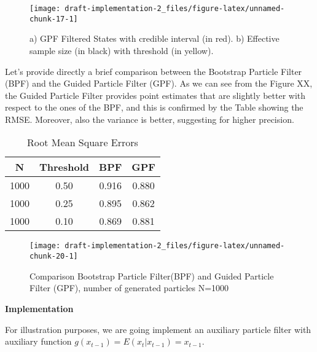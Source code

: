 \documentclass[
]{article}
\begin{document}
\begin{figure}[ht]

{\centering \texttt{[image: draft-implementation-2\_files/figure-latex/unnamed-chunk-17-1]} 

}

\caption{a) GPF Filtered States with credible interval (in red). b) Effective sample size (in black) with threshold (in yellow).}\label{fig:unnamed-chunk-17}
\end{figure}

Let's provide directly a brief comparison between the Bootstrap Particle
Filter (BPF) and the Guided Particle Filter (GPF). As we can see from
the Figure XX, the Guided Particle Filter provides point estimates that
are slightly better with respect to the ones of the BPF, and this is
confirmed by the Table showing the RMSE. Moreover, also the variance is
better, suggesting for higher precision.

\begin{longtable}[t]{cccc}
\caption{\label{tab:unnamed-chunk-19}Root Mean Square Errors}\\
\toprule
N & Threshold & BPF & GPF\\
\midrule
1000 & 0.50 & 0.916 & 0.880\\
1000 & 0.25 & 0.895 & 0.862\\
1000 & 0.10 & 0.869 & 0.881\\
\bottomrule
\end{longtable}

\begin{figure}[ht]

{\centering \texttt{[image: draft-implementation-2\_files/figure-latex/unnamed-chunk-20-1]} 

}

\caption{Comparison Bootstrap Particle Filter(BPF) and Guided Particle Filter (GPF), number of generated particles N=1000}\label{fig:unnamed-chunk-20}
\end{figure}

\textbf{Implementation}

For illustration purposes, we are going implement an auxiliary particle
filter with auxiliary function \(g(x_{t-1})=E(x_{t}|x_{t-1})=x_{t-1}\).
\end{document}
